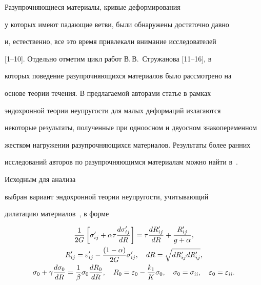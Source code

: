  Разупрочняющиеся материалы, кривые деформирования

у которых имеют падающие ветви, были обнаружены достаточно давно

и, естественно, все это время привлекали внимание исследователей

[1--10]. Отдельно отметим цикл работ В.\,В.~Стружанова [11--16], в

которых поведение разупрочняющихся материалов было рассмотрено на

основе теории течения. В предлагаемой авторами статье в рамках

эндохронной теории неупругости для малых деформаций излагаются

некоторые результаты, полученные при одноосном и двуосном знакопеременном

жестком нагружении разупрочняющихся материалов. Результаты более ранних

исследований авторов по разупрочняющимся материалам можно найти в~\cite{YIK-82, VVN-YIK-90, MAMI-2009}.



\smallskip




Исходным для анализа

выбран вариант эндохронной теории неупругости, учитывающий

дилатацию материалов~\cite{TUPP-2001}, в форме

\begin{gather}

\label{kadash:eq1}

\frac{1}{2G} \left[ \sigma_{ij}^{\prime}

+\alpha \tau \frac{d\sigma_{ij}^{\prime}}{dR} \right]=

\tau \frac{dR_{ij}^{\prime}}{dR}+\frac{R_{ij}^{\prime}}{g+\alpha},\\

\notag

R_{ij}^{\prime}=\varepsilon_{ij}^{\prime}-\frac{(1-\alpha)}{2G}

\sigma_{ij}^{\prime},\quad dR=\sqrt{dR_{ij}^{\prime} dR_{ij}^{\prime}},\\

\label{kadash:eq2}

\sigma_0+ \gamma\frac{d\sigma_0}{dR}=\frac{1}{\beta} \sigma_0

\frac{dR_0}{dR},\quad R_0=\varepsilon_0-\frac{k_1}{K}\sigma_0, \quad \sigma_0=\sigma_{ii},\quad \varepsilon_0=\varepsilon_{ii}.

\end{gather}



